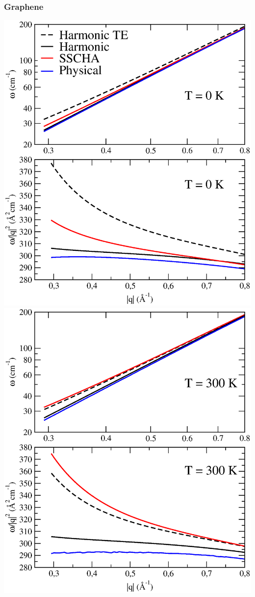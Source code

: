 \documentclass{beamer}
\begin{document}
\begin{frame}

 \frametitle{Graphene}
  \begin{center}
  \includegraphics[width=0.49\linewidth]{Pictures/Graphene/T0.eps}
  \includegraphics[width=0.49\linewidth]{Pictures/Graphene/T300.eps}
 \end{center}
 
\end{frame}

\end{document}
